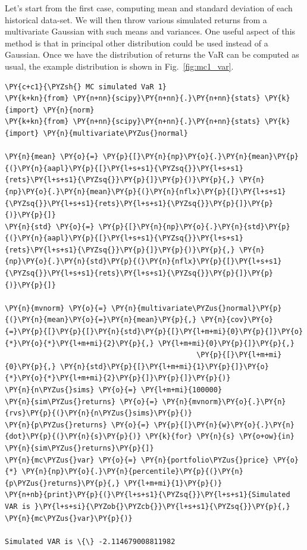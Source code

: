 Let's start from the first case, computing mean and standard deviation of each historical data-set. We will then throw various simulated returns from a multivariate Gaussian with such means and variances. 
One useful aspect of this method is that in principal other distribution could be used instead of a Gaussian.
Once we have the distribution of returns the VaR can be computed as usual, the example distribution is shown in Fig.~\ref{fig:mc1_var}.

\begin{tcolorbox}[breakable, size=fbox, boxrule=1pt, pad at break*=1mm,colback=cellbackground, colframe=cellborder]
\begin{Verbatim}[commandchars=\\\{\}]
\PY{c+c1}{\PYZsh{} MC simulated VaR 1}
\PY{k+kn}{from} \PY{n+nn}{scipy}\PY{n+nn}{.}\PY{n+nn}{stats} \PY{k}{import} \PY{n}{norm}		
\PY{k+kn}{from} \PY{n+nn}{scipy}\PY{n+nn}{.}\PY{n+nn}{stats} \PY{k}{import} \PY{n}{multivariate\PYZus{}normal}
		
\PY{n}{mean} \PY{o}{=} \PY{p}{[}\PY{n}{np}\PY{o}{.}\PY{n}{mean}\PY{p}{(}\PY{n}{aapl}\PY{p}{[}\PY{l+s+s1}{\PYZsq{}}\PY{l+s+s1}{rets}\PY{l+s+s1}{\PYZsq{}}\PY{p}{]}\PY{p}{)}\PY{p}{,} \PY{n}{np}\PY{o}{.}\PY{n}{mean}\PY{p}{(}\PY{n}{nflx}\PY{p}{[}\PY{l+s+s1}{\PYZsq{}}\PY{l+s+s1}{rets}\PY{l+s+s1}{\PYZsq{}}\PY{p}{]}\PY{p}{)}\PY{p}{]}
\PY{n}{std} \PY{o}{=} \PY{p}{[}\PY{n}{np}\PY{o}{.}\PY{n}{std}\PY{p}{(}\PY{n}{aapl}\PY{p}{[}\PY{l+s+s1}{\PYZsq{}}\PY{l+s+s1}{rets}\PY{l+s+s1}{\PYZsq{}}\PY{p}{]}\PY{p}{)}\PY{p}{,} \PY{n}{np}\PY{o}{.}\PY{n}{std}\PY{p}{(}\PY{n}{nflx}\PY{p}{[}\PY{l+s+s1}{\PYZsq{}}\PY{l+s+s1}{rets}\PY{l+s+s1}{\PYZsq{}}\PY{p}{]}\PY{p}{)}\PY{p}{]}
		
\PY{n}{mvnorm} \PY{o}{=} \PY{n}{multivariate\PYZus{}normal}\PY{p}{(}\PY{n}{mean}\PY{o}{=}\PY{n}{mean}\PY{p}{,} \PY{n}{cov}\PY{o}{=}\PY{p}{[}\PY{p}{[}\PY{n}{std}\PY{p}{[}\PY{l+m+mi}{0}\PY{p}{]}\PY{o}{*}\PY{o}{*}\PY{l+m+mi}{2}\PY{p}{,} \PY{l+m+mi}{0}\PY{p}{]}\PY{p}{,}
                                             \PY{p}{[}\PY{l+m+mi}{0}\PY{p}{,} \PY{n}{std}\PY{p}{[}\PY{l+m+mi}{1}\PY{p}{]}\PY{o}{*}\PY{o}{*}\PY{l+m+mi}{2}\PY{p}{]}\PY{p}{]}\PY{p}{)}
\PY{n}{n\PYZus{}sims} \PY{o}{=} \PY{l+m+mi}{100000}
\PY{n}{sim\PYZus{}returns} \PY{o}{=} \PY{n}{mvnorm}\PY{o}{.}\PY{n}{rvs}\PY{p}{(}\PY{n}{n\PYZus{}sims}\PY{p}{)}
\PY{n}{p\PYZus{}returns} \PY{o}{=} \PY{p}{[}\PY{n}{w}\PY{o}{.}\PY{n}{dot}\PY{p}{(}\PY{n}{s}\PY{p}{)} \PY{k}{for} \PY{n}{s} \PY{o+ow}{in} \PY{n}{sim\PYZus{}returns}\PY{p}{]}
\PY{n}{mc\PYZus{}var} \PY{o}{=} \PY{n}{portfolio\PYZus{}price} \PY{o}{*} \PY{n}{np}\PY{o}{.}\PY{n}{percentile}\PY{p}{(}\PY{n}{p\PYZus{}returns}\PY{p}{,} \PY{l+m+mi}{1}\PY{p}{)}
\PY{n+nb}{print}\PY{p}{(}\PY{l+s+s1}{\PYZsq{}}\PY{l+s+s1}{Simulated VAR is }\PY{l+s+si}{\PYZob{}\PYZcb{}}\PY{l+s+s1}{\PYZsq{}}\PY{p}{,} \PY{n}{mc\PYZus{}var}\PY{p}{)}

Simulated VAR is \{\} -2.114679008811982
\end{Verbatim}
\end{tcolorbox}

